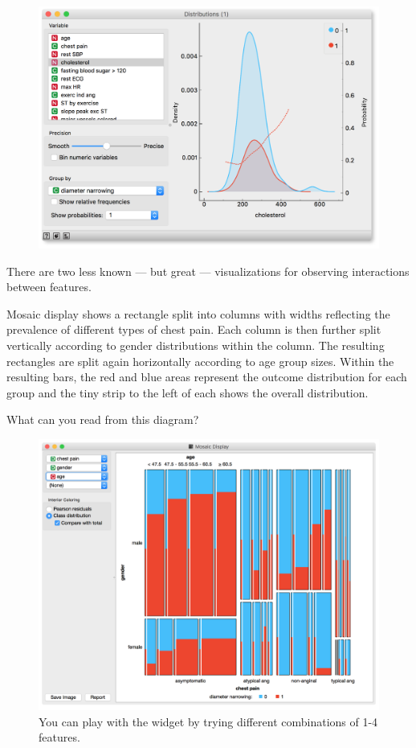\begin{figure}[h]
  \flushright
  \includegraphics[width=115mm]{basic_data_exploration-fig5.png}
  \label{fig:basic_data_exploration-fig5}
\end{figure}

There are two less known — but great — visualizations for observing interactions between features. 

Mosaic display shows a rectangle split into columns with widths reflecting the prevalence of different types of chest pain. Each column is then further split vertically according to gender distributions within the column. The resulting rectangles are split again horizontally according to age group sizes. Within the resulting bars, the red and blue areas represent the outcome distribution for each group and the tiny strip to the left of each shows the overall distribution.

\newpage
What can you read from this diagram?

\begin{figure}[h]
  \centering
  \includegraphics[width=\linewidth]{basic_data_exploration-fig6.png}
  \caption{You can play with the widget by trying different combinations of 1-4 features.}
  \label{fig:basic_data_exploration-fig6}
\end{figure}

